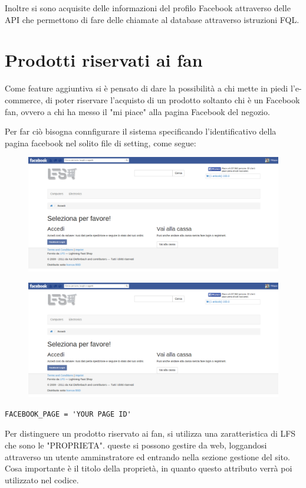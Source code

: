 Inoltre si sono acquisite delle informazioni del profilo Facebook attraverso delle API che permettono di fare delle chiamate al database attraverso istruzioni FQL.

\section{Prodotti riservati ai fan}
Come feature aggiuntiva si è pensato di dare la possibilità a chi mette in piedi l'e-commerce, di poter riservare l'acquisto di un prodotto soltanto chi è un Facebook fan, ovvero a chi ha messo il "mi piace" alla pagina Facebook del negozio.

Per far ciò bisogna connfigurare il sistema specificando l'identificativo della pagina facebook nel solito file di setting, come segue:

\begin{figure}
\includegraphics[width=0.9\columnwidth]{img/checkout}
\end{figure}

\begin{figure}
\includegraphics[width=0.9\columnwidth]{img/checkout}
\end{figure}

\begin{lstlisting}
FACEBOOK_PAGE = 'YOUR PAGE ID'
\end{lstlisting}

Per distinguere un prodotto riservato ai fan, si utilizza una zaratteristica di LFS che sono le "PROPRIETA". queste si possono gestire da web, loggandosi attraverso un utente amminstratore ed entrando nella sezione gestione del sito. Cosa importante è il titolo della proprietà, in quanto questo attributo verrà poi utilizzato nel codice.
 
